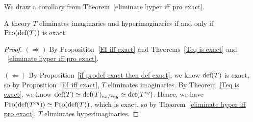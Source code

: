 We draw a corollary from Theorem~\ref{eliminate hyper iff pro exact}.

\begin{cor}
    A theory $T$ eliminates imaginaries and hyperimaginaries if and only if $\textup{Pro}(\textup{def}(T))$ is exact.
\end{cor}

\begin{proof}
    $(\Rightarrow)$ \quad By Proposition~\ref{EI iff exact} and Theorems~\ref{Teq is exact} and ~\ref{eliminate hyper iff pro exact}. 
    
    \smallskip
    
    $(\Leftarrow)$ \quad By Proposition~\ref{if prodef exact then def exact}, we know $\textup{def}(T)$ is exact, so by Proposition~\ref{EI iff exact}, $T$ eliminates imaginaries. By Theorem~\ref{Teq is exact}, we know $\textup{def}(T) \simeq \textup{def}(T)_{ex/reg} \simeq \textup{def}(T^{eq})$. Hence, we have $\textup{Pro}(\textup{def}(T^{eq})) \simeq \textup{Pro}(\textup{def}(T))$, which is exact, so by Theorem~\ref{eliminate hyper iff pro exact}, $T$ eliminates hyperimaginaries.
    
\end{proof}
